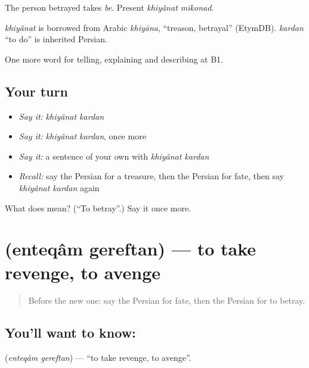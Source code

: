 The person betrayed takes \emph{be}. Present \emph{khiyânat mikonad}.

\begin{cousinweb}
\emph{khiyânat} is borrowed from Arabic \emph{khiyāna}, \textquotedblleft{}treason, betrayal\textquotedblright{} (EtymDB). \emph{kardan} \textquotedblleft{}to do\textquotedblright{} is inherited Persian.
\end{cousinweb}

\begin{grammarlens}[title={What you've built}]
One more word for telling, explaining and describing at B1.
\end{grammarlens}

\subsection*{Your turn}
\begin{itemize}
\raggedright
  \item \emph{Say it:} \emph{khiyânat kardan}
  \item \emph{Say it:} \emph{khiyânat kardan}, once more
  \item \emph{Say it:} a sentence of your own with \emph{khiyânat kardan}
  \item \emph{Recall:} say the Persian for a treasure, then the Persian for fate, then say \emph{khiyânat kardan} again
\end{itemize}

\begin{tcolorbox}[breakable,colback=teal!4,colframe=teal!35!black,title={Before you move on}]
What does   mean? (\textquotedblleft{}To betray\textquotedblright{}.) Say it once more.
\end{tcolorbox}
\section[\texorpdfstring{\fa{انتقام} \fa{گرفتن} (enteqâm gereftan)}{انتقام گرفتن (enteqâm gereftan)}]{  (enteqâm gereftan) — to take revenge, to avenge}

\label{lesson:FA-C349-enteqam-gereftan}



\begin{quote}
Before the new one: say the Persian for fate, then the Persian for to betray.
\end{quote}

\subsection*{You'll want to know:  }
\textbf{ } (\emph{enteqâm gereftan}) — \textquotedblleft{}to take revenge, to avenge\textquotedblright{}.

